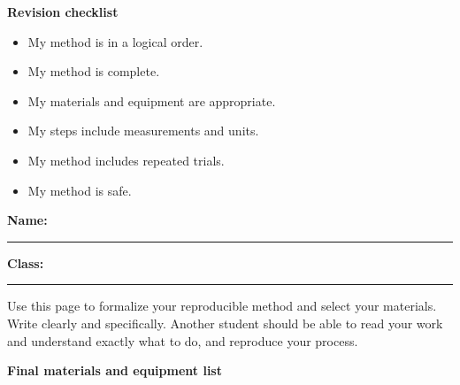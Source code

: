 \documentclass[12pt]{article}
\begin{document}
\vspace{2em}
\textbf{Revision checklist}

\begin{minipage}{0.48\textwidth}
\begin{itemize}[leftmargin=1.5em]
    \item[$\square$] My method is in a logical order.
    \item[$\square$] My method is complete.
    \item[$\square$] My materials and equipment are appropriate.
\end{itemize}
\end{minipage}
\hfill
\begin{minipage}{0.48\textwidth}
\begin{itemize}[leftmargin=1.5em]
    \item[$\square$] My steps include measurements and units.
    \item[$\square$] My method includes repeated trials.
    \item[$\square$] My method is safe.
\end{itemize}
\end{minipage}

\newpage

\textbf{Name:} \rule{0.3\textwidth}{0.4pt}
\hfill
\textbf{Class:} \rule{0.25\textwidth}{0.4pt}
\hfill

\vspace{1em}

\begin{draftbox}
Use this page to formalize your reproducible method and select your materials. Write clearly and specifically. Another student should be able to read your work and understand exactly what to do, and reproduce your process.
\end{draftbox}

\textbf{Final materials and equipment list}

\vspace{1em}
\end{document}
